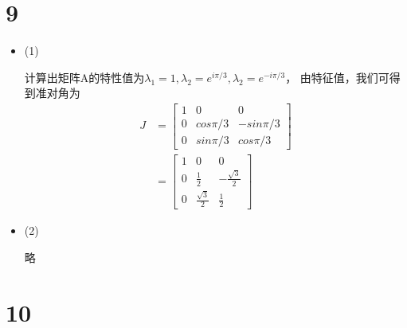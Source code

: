 \documentclass{article}
\begin{document}
\section*{9}

\begin{itemize}
  \item (1)

        计算出矩阵A的特性值为$\lambda_1 = 1, \lambda_2 = e^{i\pi/3}, \lambda_2 = e^{- i\pi/3}$，
        由特征值，我们可得到准对角为
        \begin{align*}
          J & = \begin{bmatrix}
                  1 & 0         & 0          \\
                  0 & cos \pi/3 & -sin \pi/3 \\
                  0 & sin \pi/3 & cos \pi/3
                \end{bmatrix}                                 \\
            & = \begin{bmatrix}
                  1 & 0                  & 0                   \\
                  0 & \frac{1}{2}        & -\frac{\sqrt{3}}{2} \\
                  0 & \frac{\sqrt{3}}{2} & \frac{1}{2}
                \end{bmatrix}
        \end{align*}

  \item (2)

        略
\end{itemize}

\section*{10}
\end{document}
